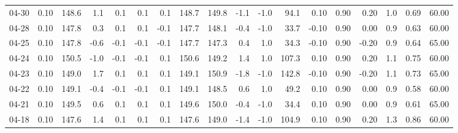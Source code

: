 \begin{threeparttable}
{\begin{tabular}{lrrrrrrrrrrrrrrrrr}
  04-30 &     0.10 & 148.6 &               1.1 &               0.1 &                0.1 &                0.1 & 148.7 & 149.8 &       -1.1 &                     -1.0 &                94.1 &       0.10 &      0.90 &           0.20 &              1.0 &            0.69 &                  60.00 \\
  04-28 &     0.10 & 147.8 &               0.3 &               0.1 &                0.1 &               -0.1 & 147.7 & 148.1 &       -0.4 &                     -1.0 &                33.7 &      -0.10 &      0.90 &           0.00 &              0.9 &            0.63 &                  60.00 \\
  04-25 &     0.10 & 147.8 &              -0.6 &              -0.1 &               -0.1 &               -0.1 & 147.7 & 147.3 &        0.4 &                      1.0 &                34.3 &      -0.10 &      0.90 &          -0.20 &              0.9 &            0.64 &                  65.00 \\
  04-24 &     0.10 & 150.5 &              -1.0 &              -0.1 &               -0.1 &                0.1 & 150.6 & 149.2 &        1.4 &                      1.0 &               107.3 &       0.10 &      0.90 &           0.20 &              1.1 &            0.75 &                  60.00 \\
  04-23 &     0.10 & 149.0 &               1.7 &               0.1 &                0.1 &                0.1 & 149.1 & 150.9 &       -1.8 &                     -1.0 &               142.8 &      -0.10 &      0.90 &          -0.20 &              1.1 &            0.73 &                  65.00 \\
  04-22 &     0.10 & 149.1 &              -0.4 &              -0.1 &               -0.1 &                0.1 & 149.1 & 148.5 &        0.6 &                      1.0 &                49.2 &       0.10 &      0.90 &           0.00 &              0.9 &            0.58 &                  60.00 \\
  04-21 &     0.10 & 149.5 &               0.6 &               0.1 &                0.1 &                0.1 & 149.6 & 150.0 &       -0.4 &                     -1.0 &                34.4 &       0.10 &      0.90 &           0.00 &              0.9 &            0.61 &                  65.00 \\
  04-18 &     0.10 & 147.6 &               1.4 &               0.1 &                0.1 &                0.1 & 147.6 & 149.0 &       -1.4 &                     -1.0 &               104.9 &       0.10 &      0.90 &           0.20 &              1.3 &            0.86 &                  60.00 \\

\end{tabular}}
\end{threeparttable}
